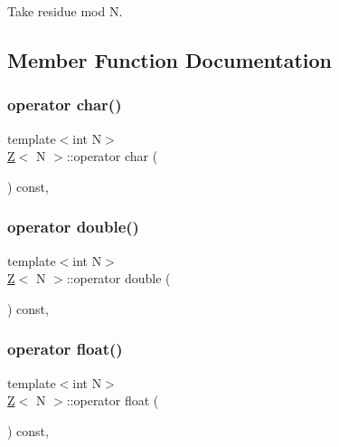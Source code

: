 Take residue mod N. 



\subsection{Member Function Documentation}
\mbox{\label{classZ_ae97fcd6db1faa3170e7764670b3ea1a9}} 
\subsubsection{\texorpdfstring{operator char()}{operator char()}}
{\footnotesize\ttfamily template$<$int N$>$ \\
\hyperlink{classZ}{Z}$<$ N $>$\+::operator char (\begin{DoxyParamCaption}{ }\end{DoxyParamCaption}) const\hspace{0.3cm}{\ttfamily [inline]}, {\ttfamily [explicit]}}

\mbox{\label{classZ_a819290a913ce32272c6cdb7407846057}} 
\subsubsection{\texorpdfstring{operator double()}{operator double()}}
{\footnotesize\ttfamily template$<$int N$>$ \\
\hyperlink{classZ}{Z}$<$ N $>$\+::operator double (\begin{DoxyParamCaption}{ }\end{DoxyParamCaption}) const\hspace{0.3cm}{\ttfamily [inline]}, {\ttfamily [explicit]}}

\mbox{\label{classZ_a9bb3636d1ffd75dc1a221251f71d4781}} 
\subsubsection{\texorpdfstring{operator float()}{operator float()}}
{\footnotesize\ttfamily template$<$int N$>$ \\
\hyperlink{classZ}{Z}$<$ N $>$\+::operator float (\begin{DoxyParamCaption}{ }\end{DoxyParamCaption}) const\hspace{0.3cm}{\ttfamily [inline]}, {\ttfamily [explicit]}}

